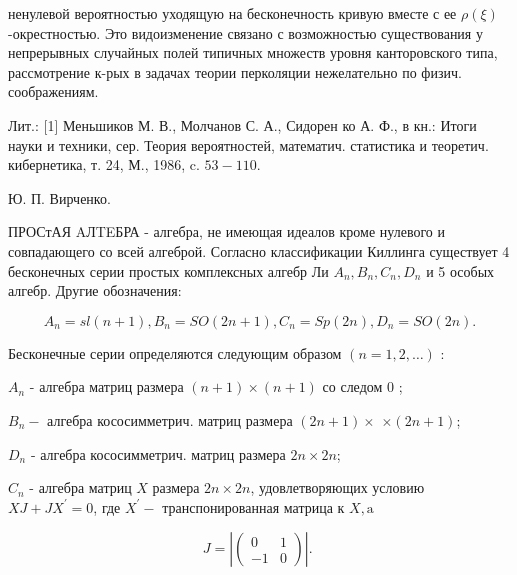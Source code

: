 \documentclass[10pt]{article}
\begin{document}
ненулевой вероятностью уходящую на бесконечность кривую вместе с ее $\rho(\xi)$-окрестностью. Это видоизменение связано с возможностью существования у непрерывных случайных полей типичных множеств уровня канторовского типа, рассмотрение к-рых в задачах теории перколяции нежелательно по физич. соображениям.



Лит.: [1] Меньшиков М. В., Молчанов С. А., Сидорен ко А. Ф., в кн.: Итоги науки и техники, сер. Теория вероятностей, математич. статистика и теоретич. кибернетика, т. 24, М., 1986, c. $53-110$.



Ю. П. Вирченко.



ПРОСтАЯ AЛTEБРА - алгебра, не имеющая идеалов кроме нулевого и совпадающего со всей алгеброй. Согласно классификации Киллинга существует 4 бесконечных серии простых комплексных алгебр Ли $A_{n}, B_{n}, C_{n}, D_{n}$ и 5 особых алгебр. Другие обозначения:



\[

A_{n}=s l(n+1), B_{n}=S O(2 n+1), C_{n}=S p(2 n), D_{n}=S O(2 n) .

\]



Бесконечные серии определяются следующим образом $(n=1,2, \ldots)$ :



$A_{n}$ - алгебра матриц размера $(n+1) \times(n+1)$ со следом 0 ;



$B_{n}-$ алгебра кососимметрич. матриц размера $(2 n+1) \times$ $\times(2 n+1)$;



$D_{n}$ - алгебра кососимметрич. матриц размера $2 n \times 2 n$;



$C_{n}$ - алгебра матриц $X$ размера $2 n \times 2 n$, удовлетворяющих условию $X J+J X^{\prime}=0$, где $X^{\prime}-$ транспонированная матрица к $X, \mathrm{a}$



\[

J=\left|\left(\begin{array}{rr}

0 & 1 \\

-1 & 0

\end{array}\right)\right| \text {. }

\]
\end{document}
